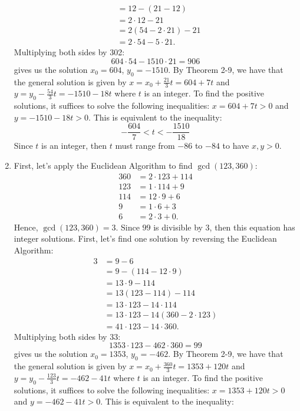 \begin{solution}
\begin{enumerate}
\begin{align*}
            &= 12 - (21 - 12) \\
            &= 2 \cdot 12 - 21 \\
            &= 2(54 - 2\cdot 21) - 21 \\
            &= 2\cdot 54 - 5 \cdot 21.
        \end{align*}
        Multiplying both sides by 302:
        $$604 \cdot 54 - 1510 \cdot 21 = 906$$
        gives us the solution $x_0 = 604$, $y_0 = -1510$. By Theorem 2-9, we have that the general solution is given by $x = x_0 + \frac{21}{3}t = 604 + 7t$ and $y = y_0 - \frac{54}{3}t = -1510 - 18t$ where $t$ is an integer. To find the positive solutions, it suffices to solve the following inequalities: $x = 604 + 7t > 0$ and $y = -1510 - 18t > 0$. This is equivalent to the inequality:
        $$-\frac{604}{7} < t < -\frac{1510}{18}$$
        Since $t$ is an integer, then $t$ must range from $-86$ to $-84$ to have $x,y > 0$.
        \item First, let's apply the Euclidean Algorithm to find $\gcd(123, 360)$:
        \begin{align*}
            360 &= 2\cdot 123 + 114 \\
            123 &= 1 \cdot 114 + 9 \\
            114 &= 12\cdot 9 + 6 \\
            9 &= 1 \cdot 6 + 3 \\
            6 &= 2 \cdot 3 + 0.
        \end{align*}
        Hence, $\gcd(123, 360) = 3$. Since $99$ is divisible by 3, then this equation has integer solutions. First, let's find one solution by reversing the Euclidean Algorithm:
        \begin{align*}
            3 &= 9 - 6 \\
            &= 9 - (114 - 12 \cdot 9) \\
            &= 13 \cdot 9 - 114 \\
            &= 13(123 - 114) - 114 \\
            &= 13 \cdot 123 - 14 \cdot 114 \\
            &= 13 \cdot 123 - 14 (360 - 2\cdot 123) \\
            &= 41 \cdot 123 - 14 \cdot 360.
        \end{align*}
        Multiplying both sides by 33:
        $$1353 \cdot 123 - 462 \cdot 360 = 99$$
        gives us the solution $x_0 = 1353$, $y_0 = -462$. By Theorem 2-9, we have that the general solution is given by $x = x_0 + \frac{360}{3}t = 1353 + 120t$ and $y = y_0 - \frac{123}{3}t = -462 - 41t$ where $t$ is an integer. To find the positive solutions, it suffices to solve the following inequalities: $x = 1353 + 120t > 0$ and $y = -462 - 41t > 0$. This is equivalent to the inequality:

\end{enumerate}
\end{solution}

